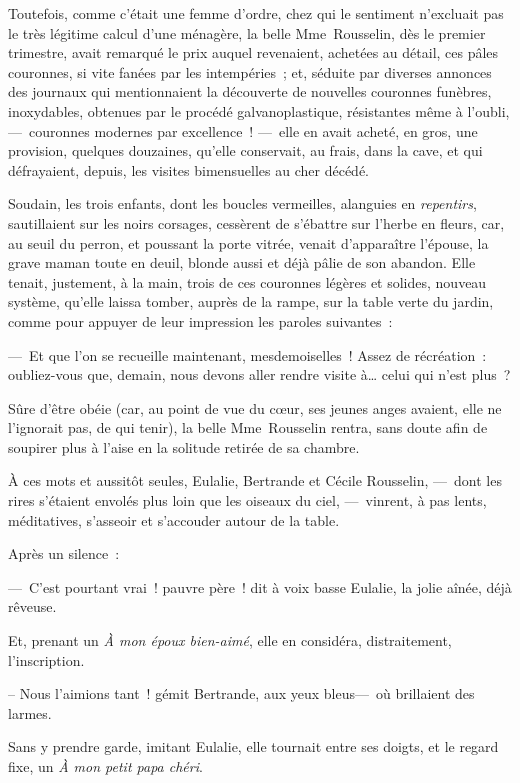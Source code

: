 \documentclass[french,twoside]{book} %
\begin{document}
Toutefois, comme c’était une femme d’ordre, chez qui le sentiment n’excluait pas le très légitime   calcul d’une ménagère, la belle Mme Rousselin, dès le premier trimestre, avait remarqué le prix auquel revenaient, achetées au détail, ces pâles couronnes, si vite fanées par les intempéries ; et, séduite par diverses annonces des journaux qui mentionnaient la découverte de nouvelles couronnes funèbres, inoxydables, obtenues par le procédé galvanoplastique, résistantes même à l’oubli, — couronnes modernes par excellence ! — elle en avait acheté, en gros, une provision, quelques douzaines, qu’elle conservait, au frais, dans la cave, et qui défrayaient, depuis, les visites bimensuelles au cher décédé.\par
Soudain, les trois enfants, dont les boucles vermeilles, alanguies en \emph{repentirs}, sautillaient sur les noirs corsages, cessèrent de s’ébattre sur l’herbe en fleurs, car, au seuil du perron, et poussant la porte vitrée, venait d’apparaître l’épouse, la grave maman toute en deuil, blonde aussi et déjà pâlie de son abandon. Elle tenait, justement, à la main, trois de ces couronnes   légères et solides, nouveau système, qu’elle laissa tomber, auprès de la rampe, sur la table verte du jardin, comme pour appuyer de leur impression les paroles suivantes :\par
— Et que l’on se recueille maintenant, mesdemoiselles ! Assez de récréation : oubliez-vous que, demain, nous devons aller rendre visite à… celui qui n’est plus ?\par
Sûre d’être obéie (car, au point de vue du cœur, ses jeunes anges avaient, elle ne l’ignorait pas, de qui tenir), la belle Mme Rousselin rentra, sans doute afin de soupirer plus à l’aise en la solitude retirée de sa chambre.\par
À ces mots et aussitôt seules, Eulalie, Bertrande et Cécile Rousselin, — dont les rires s’étaient envolés plus loin que les oiseaux du ciel, — vinrent, à pas lents, méditatives, s’asseoir et s’accouder autour de la table.\par
Après un silence :\par
— C’est pourtant vrai ! pauvre père ! dit à voix basse Eulalie, la jolie aînée, déjà rêveuse.\par
Et, prenant un \emph{À mon époux bien-aimé}, elle en considéra, distraitement, l’inscription.\par
   – Nous l’aimions tant ! gémit Bertrande, aux yeux bleus— où brillaient des larmes.\par
Sans y prendre garde, imitant Eulalie, elle tournait entre ses doigts, et le regard fixe, un \emph{À mon petit papa chéri}.\par
\end{document}
